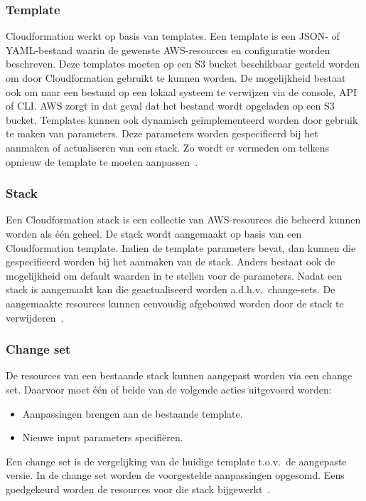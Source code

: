 \subsubsection{Template}

Cloudformation werkt op basis van templates.
Een template is een JSON- of YAML-bestand waarin de gewenste AWS-resources en configuratie worden beschreven.
Deze templates moeten op een S3 bucket beschikbaar gesteld worden om door Cloudformation gebruikt te kunnen worden.
De mogelijkheid bestaat ook om naar een bestand op een lokaal systeem te verwijzen via de console, API of CLI.
AWS zorgt in dat geval dat het bestand wordt opgeladen op een S3 bucket.
Templates kunnen ook dynamisch geïmplementeerd worden door gebruik te maken van parameters.
Deze parameters worden gespecifieerd bij het aanmaken of actualiseren van een stack.
Zo wordt er vermeden om telkens opnieuw de template te moeten aanpassen~\autocite{AWSCLoudformationUser}.

\subsubsection{Stack}

Een Cloudformation stack is een collectie van AWS-resources die beheerd kunnen worden als één geheel.
De stack wordt aangemaakt op basis van een Cloudformation template.
Indien de template parameters bevat, dan kunnen die gespecifieerd worden bij het aanmaken van de stack.
Anders bestaat ook de mogelijkheid om default waarden in te stellen voor de parameters.
Nadat een stack is aangemaakt kan die geactualiseerd worden a.d.h.v.\ change-sets.
De aangemaakte resources kunnen eenvoudig afgebouwd worden door de stack te verwijderen~\autocite{AWSCLoudformationUser}.

\subsubsection{Change set}

De resources van een bestaande stack kunnen aangepast worden via een change set.
Daarvoor moet één of beide van de volgende acties uitgevoerd worden:

\begin{itemize}
    \item Aanpassingen brengen aan de bestaande template.
    \item Nieuwe input parameters specifiëren.
\end{itemize}

Een change set is de vergelijking van de huidige template t.o.v.\ de aangepaste versie.
In de change set worden de voorgestelde aanpassingen opgesomd.
Eens goedgekeurd worden de resources voor die stack bijgewerkt~\autocite{AWSCLoudformationUser}.

